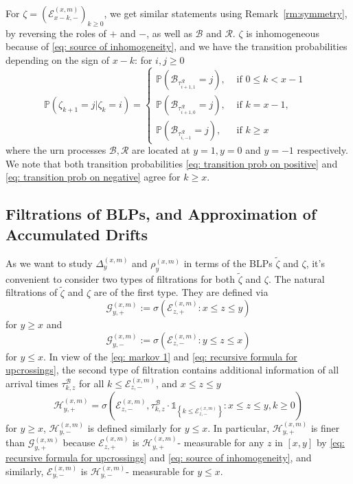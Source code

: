 \documentclass[EJP]{ejpecp} %
\begin{document}
For $\zeta= \left(\mathcal{E}^{(x,m)}_{x-k,-} \right)_{k\geq 0}$, we get similar statements using Remark~\ref{rm:symmetry}, by reversing the roles of $+$ and $-$, as well as $\mathcal{B}$ and $\mathcal{R}$. $\zeta$ is inhomogeneous because of \eqref{eq: source of inhomogeneity}, and we have the transition probabilities depending on the sign of $x-k$: for $i,j\geq 0$
\begin{equation}\label{eq: transition prob on negative}
	\mathbb{P}\left(\zeta_{k+1}=j \vert \zeta_k =i  \right) = 
	\begin{cases}
		\mathbb{P}\left( \mathcal{B}_{\tau_{i+1,1}^{\mathcal{R}}} = j \right) ,& \mbox{ if $0 \leq k <  x-1$ }
		\\
		\mathbb{P}\left( \mathcal{B}_{\tau_{i+1,0}^{\mathcal{R}}} = j \right) ,& \mbox{ if $k =  x-1$, }
		\\
		\mathbb{P}\left( \mathcal{B}_{\tau_{i,-1}^{\mathcal{R}}} = j \right) ,& \mbox{ if $k \geq x$ }
	\end{cases}
\end{equation}
where the urn processes $\mathcal{B}, \mathcal{R}$ are located at $y = 1, y=0$ and $y = -1$ respectively. We note that both transition probabilities \eqref{eq: transition prob on positive} and \eqref{eq: transition prob on negative} agree for $k \ge x$.


\subsection{Filtrations of BLPs, and Approximation of Accumulated Drifts}\label{subsec: measurability}

As we want to study $\Delta^{(x,m)}_{y}$ and $\rho^{(x,m)}_{y}$ in terms of the BLPs $\tilde{\zeta}$ and $\zeta$, it's convenient to consider two types of filtrations for both $\tilde{\zeta}$ and $\zeta$. The natural filtrations of $\tilde{\zeta}$ and $\zeta$ are of the first type. They are defined via 
$$\mathcal{G}_{y, +}^{(x,m)}:=\sigma\left(\mathcal{E}^{(x,m)}_{z, +}: x \le z \le y\right) $$ for $y \ge x$ and $$\mathcal{G}_{y, -}^{(x,m)}:=\sigma\left(\mathcal{E}^{(x,m)}_{z, -}: y \le z \le x\right) $$ for $y \le x$.
In view of the \eqref{eq: markov 1} and \eqref{eq: recursive formula for upcrossings},
the second type of filtration contains additional information of all arrival times $\tau^\mathcal{B}_{k,z}$ for all $k\leq \mathcal{E}^{(x,m)}_{z, -}$, and $x\leq z \leq y$
\[
\mathcal{H}_{y, +}^{(x,m)} = \sigma\left( \mathcal{E}_{z, -}^{(x,m)}, \tau_{k, z}^\mathcal{B}\cdot \mathbb{1}_{\left\{ k\leq \mathcal{E}_{z, -}^{(x,m)} \right\}} : x \leq  z \leq y,  k \geq 0 \right) 
\]
for $y\geq x$, $\mathcal{H}_{y, -}^{(x,m)}$ is defined similarly for $y\leq x$.
In particular, $\mathcal{H}_{y, +}^{(x,m)}$ is finer than $\mathcal{G}_{y, +}^{(x,m)}$ because $\mathcal{E}_{z, +}^{(x,m)}$ is $\mathcal{H}_{y, +}^{(x,m)}$- measurable for any $z$ in $[x,y]$ by \eqref{eq: recursive formula for upcrossings} and \eqref{eq: source of inhomogeneity}, and similarly, $\mathcal{E}_{y, -}^{(x,m)}$ is $\mathcal{H}_{y, -}^{(x,m)}$- measurable for $ y\leq x$. 
\end{document}
